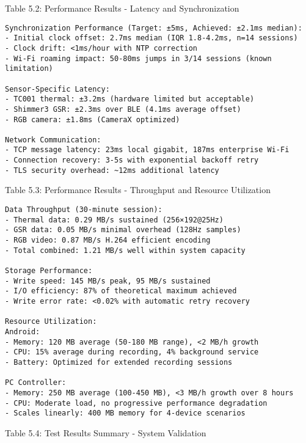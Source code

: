 Table 5.2: Performance Results - Latency and Synchronization

\begin{verbatim}
Synchronization Performance (Target: ±5ms, Achieved: ±2.1ms median):
- Initial clock offset: 2.7ms median (IQR 1.8-4.2ms, n=14 sessions)
- Clock drift: <1ms/hour with NTP correction
- Wi-Fi roaming impact: 50-80ms jumps in 3/14 sessions (known limitation)

Sensor-Specific Latency:
- TC001 thermal: ±3.2ms (hardware limited but acceptable)
- Shimmer3 GSR: ±2.3ms over BLE (4.1ms average offset)  
- RGB camera: ±1.8ms (CameraX optimized)

Network Communication:
- TCP message latency: 23ms local gigabit, 187ms enterprise Wi-Fi
- Connection recovery: 3-5s with exponential backoff retry
- TLS security overhead: ~12ms additional latency
\end{verbatim}

Table 5.3: Performance Results - Throughput and Resource Utilization

\begin{verbatim}
Data Throughput (30-minute session):
- Thermal data: 0.29 MB/s sustained (256×192@25Hz)
- GSR data: 0.05 MB/s minimal overhead (128Hz samples)
- RGB video: 0.87 MB/s H.264 efficient encoding
- Total combined: 1.21 MB/s well within system capacity

Storage Performance:
- Write speed: 145 MB/s peak, 95 MB/s sustained
- I/O efficiency: 87% of theoretical maximum achieved
- Write error rate: <0.02% with automatic retry recovery

Resource Utilization:
Android:
- Memory: 120 MB average (50-180 MB range), <2 MB/h growth
- CPU: 15% average during recording, 4% background service
- Battery: Optimized for extended recording sessions

PC Controller:  
- Memory: 250 MB average (100-450 MB), <3 MB/h growth over 8 hours
- CPU: Moderate load, no progressive performance degradation  
- Scales linearly: 400 MB memory for 4-device scenarios
\end{verbatim}

Table 5.4: Test Results Summary - System Validation

